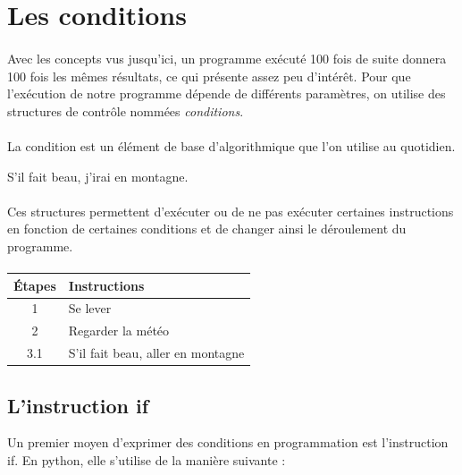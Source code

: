 \documentclass[11pt, a4paper]{book}
\begin{document}
\newpage

\section{Les conditions}

\paragraph{} Avec les concepts vus jusqu'ici, un programme exécuté 100 fois de suite donnera 100 fois les mêmes résultats, ce qui présente assez peu d'intérêt. Pour que l'exécution de notre programme dépende de différents paramètres, on utilise des structures de contrôle nommées \textit{conditions}.

\paragraph{} La condition est un élément de base d'algorithmique que l'on utilise au quotidien.
 \begin{example} S'il fait beau, j'irai en montagne. \end{example}


\paragraph{} Ces structures permettent d'exécuter ou de ne pas exécuter certaines instructions en fonction de certaines conditions et de changer ainsi le déroulement du programme.

\paragraph{}
\begin{tabular}{ c  l  }
     Étapes & Instructions \\ \hline
     1 & Se lever  \\ 
     2 & Regarder la météo  \\
     3.1 & S'il fait beau, aller en montagne  \\
\end{tabular}


\subsection{L'instruction \textsf{if}}
Un premier moyen d'exprimer des conditions en programmation est l'instruction \textsf{if}. En python, elle s'utilise de la manière suivante : 
\end{document}
